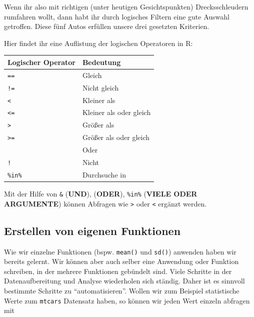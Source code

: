 \documentclass[
]{article}
\begin{document}
Wenn ihr also mit richtigen (unter heutigen Gesichtspunkten) Drecksschleudern rumfahren wollt, dann habt ihr durch logisches Filtern eine gute Auswahl getroffen. Diese fünf Autos erfüllen unsere drei gesetzten Kriterien.

Hier findet ihr eine Auflistung der logischen Operatoren in R:

\begin{longtable}[]{@{}ll@{}}
\toprule
Logischer Operator & Bedeutung \\
\midrule
\endhead
\texttt{==} & Gleich \\
\texttt{!=} & Nicht gleich \\
\texttt{\textless{}} & Kleiner als \\
\texttt{\textless{}=} & Kleiner als oder gleich \\
\texttt{\textgreater{}} & Größer als \\
\texttt{\textgreater{}=} & Größer als oder gleich \\
\texttt{\textbar{}} & Oder \\
\texttt{!} & Nicht \\
\texttt{\%in\%} & Durchsuche in \\
\bottomrule
\end{longtable}

Mit der Hilfe von \texttt{\&} (\textbf{UND}), \texttt{\textbar{}} (\textbf{ODER}), \texttt{\%in\%} (\textbf{VIELE ODER ARGUMENTE}) können Abfragen wie \texttt{\textgreater{}} oder \texttt{\textless{}} ergänzt werden.

\hypertarget{erstellen-von-eigenen-funktionen}{%
\subsection{Erstellen von eigenen Funktionen}\label{erstellen-von-eigenen-funktionen}}

Wie wir einzelne Funktionen (bspw. \texttt{mean()} und \texttt{sd()}) anwenden haben wir bereits gelernt. Wir können aber auch selber eine Anwendung oder Funktion schreiben, in der mehrere Funktionen gebündelt sind. Viele Schritte in der Datenaufbereitung und Analyse wiederholen sich ständig. Daher ist es sinnvoll bestimmte Schritte zu ``automatisieren''. Wollen wir zum Beispiel statistische Werte zum \texttt{mtcars} Datensatz haben, so können wir jeden Wert einzeln abfragen mit
\end{document}

